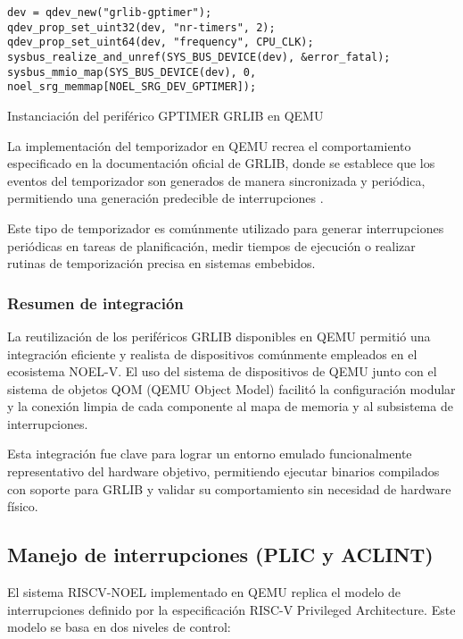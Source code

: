 \begin{codefloat}
\begin{lstlisting}[style=CppExample]
dev = qdev_new("grlib-gptimer");
qdev_prop_set_uint32(dev, "nr-timers", 2);
qdev_prop_set_uint64(dev, "frequency", CPU_CLK);
sysbus_realize_and_unref(SYS_BUS_DEVICE(dev), &error_fatal);
sysbus_mmio_map(SYS_BUS_DEVICE(dev), 0, noel_srg_memmap[NOEL_SRG_DEV_GPTIMER]);
\end{lstlisting}
\caption{Instanciación del periférico GPTIMER GRLIB en QEMU}
\end{codefloat}

La implementación del temporizador en QEMU recrea el comportamiento especificado en la documentación oficial de GRLIB, donde se establece que los eventos del temporizador son generados de manera sincronizada y periódica, permitiendo una generación predecible de interrupciones \cite{grlib_ip_core_user_manual}.

Este tipo de temporizador es comúnmente utilizado para generar interrupciones periódicas en tareas de planificación, medir tiempos de ejecución o realizar rutinas de temporización precisa en sistemas embebidos.

\subsubsection*{Resumen de integración}

La reutilización de los periféricos GRLIB disponibles en QEMU permitió una integración eficiente y realista de dispositivos comúnmente empleados en el ecosistema NOEL-V. El uso del sistema de dispositivos de QEMU junto con el sistema de objetos QOM (QEMU Object Model) facilitó la configuración modular y la conexión limpia de cada componente al mapa de memoria y al subsistema de interrupciones.

Esta integración fue clave para lograr un entorno emulado funcionalmente representativo del hardware objetivo, permitiendo ejecutar binarios compilados con soporte para GRLIB y validar su comportamiento sin necesidad de hardware físico.

\subsection{Manejo de interrupciones (PLIC y ACLINT)}
\label{subsec:interrupciones-noel}

El sistema RISCV-NOEL implementado en QEMU replica el modelo de interrupciones definido por la especificación RISC-V Privileged Architecture. Este modelo se basa en dos niveles de control:

